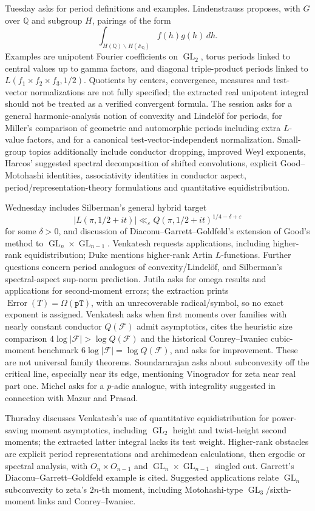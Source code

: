 \documentclass[11pt]{article}
\newcommand{\Q}{\mathbb{Q}}
\newcommand{\A}{\mathbb{A}}
\begin{document}
Tuesday asks for period definitions and examples. Lindenstrauss proposes, with $G$ over $\Q$ and subgroup $H$, pairings of the form
\[
 \int_{H(\Q)\backslash H(\A_{\Q})} f(h)g(h)\,dh.
\]
Examples are unipotent Fourier coefficients on $\operatorname{GL}_2$, torus periods linked to central values up to gamma factors, and diagonal triple-product periods linked to $L(f_1\times f_2\times f_3,1/2)$. Quotients by centers, convergence, measures and test-vector normalizations are not fully specified; the extracted real unipotent integral should not be treated as a verified convergent formula. The session asks for a general harmonic-analysis notion of convexity and Lindel\"of for periods, for Miller's comparison of geometric and automorphic periods including extra $L$-value factors, and for a canonical test-vector-independent normalization. Small-group topics additionally include conductor dropping, improved Weyl exponents, Harcos' suggested spectral decomposition of shifted convolutions, explicit Good--Motohashi identities, associativity identities in conductor aspect, period/representation-theory formulations and quantitative equidistribution.

Wednesday includes Silberman's general hybrid target
\[
 |L(\pi,1/2+it)|\ll_\varepsilon Q(\pi,1/2+it)^{1/4-\delta+\varepsilon}
\]
for some $\delta>0$, and discussion of Diaconu--Garrett--Goldfeld's extension of Good's method to $\operatorname{GL}_n\times\operatorname{GL}_{n-1}$. Venkatesh requests applications, including higher-rank equidistribution; Duke mentions higher-rank Artin $L$-functions. Further questions concern period analogues of convexity/Lindel\"of, and Silberman's spectral-aspect sup-norm prediction. Jutila asks for omega results and applications for second-moment errors; the extraction prints $\operatorname{Error}(T)=\Omega(\texttt{pT})$, with an unrecoverable radical/symbol, so no exact exponent is assigned. Venkatesh asks when first moments over families with nearly constant conductor $Q(\mathcal F)$ admit asymptotics, cites the heuristic size comparison $4\log|\mathcal F|>\log Q(\mathcal F)$ and the historical Conrey--Iwaniec cubic-moment benchmark $6\log|\mathcal F|=\log Q(\mathcal F)$, and asks for improvement. These are not universal family theorems. Soundararajan asks about subconvexity off the critical line, especially near its edge, mentioning Vinogradov for zeta near real part one. Michel asks for a $p$-adic analogue, with integrality suggested in connection with Mazur and Prasad.

Thursday discusses Venkatesh's use of quantitative equidistribution for power-saving moment asymptotics, including $\operatorname{GL}_2$ height and twist-height second moments; the extracted latter integral lacks its test weight. Higher-rank obstacles are explicit period representations and archimedean calculations, then ergodic or spectral analysis, with $O_n\times O_{n-1}$ and $\operatorname{GL}_n\times\operatorname{GL}_{n-1}$ singled out. Garrett's Diaconu--Garrett--Goldfeld example is cited. Suggested applications relate $\operatorname{GL}_n$ subconvexity to zeta's $2n$-th moment, including Motohashi-type $\operatorname{GL}_3$/sixth-moment links and Conrey--Iwaniec.
\end{document}
